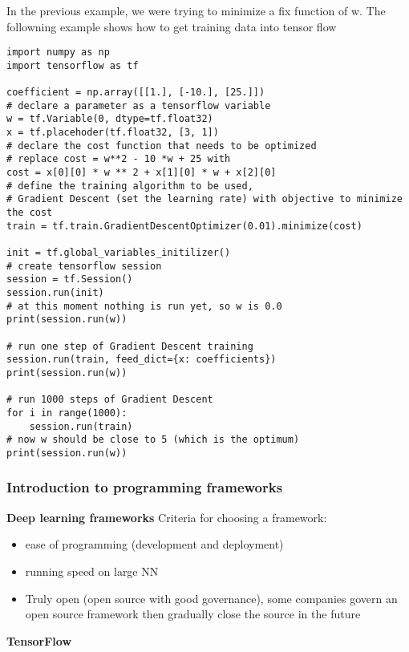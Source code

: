 In the previous example, we were trying to minimize a fix function of w. The followning example shows how to get training data into tensor flow
\begin{lstlisting}
import numpy as np
import tensorflow as tf

coefficient = np.array([[1.], [-10.], [25.]])
# declare a parameter as a tensorflow variable
w = tf.Variable(0, dtype=tf.float32)
x = tf.placehoder(tf.float32, [3, 1])
# declare the cost function that needs to be optimized
# replace cost = w**2 - 10 *w + 25 with
cost = x[0][0] * w ** 2 + x[1][0] * w + x[2][0]
# define the training algorithm to be used, 
# Gradient Descent (set the learning rate) with objective to minimize the cost
train = tf.train.GradientDescentOptimizer(0.01).minimize(cost)

init = tf.global_variables_initilizer()
# create tensorflow session
session = tf.Session()
session.run(init)
# at this moment nothing is run yet, so w is 0.0
print(session.run(w))

# run one step of Gradient Descent training
session.run(train, feed_dict={x: coefficients})
print(session.run(w))

# run 1000 steps of Gradient Descent
for i in range(1000):
    session.run(train)
# now w should be close to 5 (which is the optimum)
print(session.run(w))
\end{lstlisting}

\subsubsection*{Introduction to programming frameworks}

\textbf{Deep learning frameworks} Criteria for choosing a framework:
\begin{itemize}
    \item ease of programming (development and deployment)
    \item running speed on large NN
    \item Truly open (open source with good governance), some companies govern an open source framework then gradually close the source in the future
\end{itemize}
\textbf{TensorFlow}



